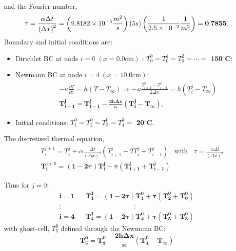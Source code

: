 \documentclass[calculator,steamtables,datasheet,solutions]{exam_newMarcus2}
\newcommand{\frc}{\displaystyle\frac}
\begin{document}
\begin{question}
\begin{enumerate}
{\begin{displaymath}
\end{displaymath}
and the Fourier number,~
\begin{displaymath}
  \tau = \frc{\alpha \Delta t}{\left(\Delta x\right)^{2}} = \left(9.8182\times 10^{-5} \frc{m^{2}}{s}\right)\left( 5 s\right)\left(\frc{1}{2.5\times 10^{-2}}\frc{1}{m^{2}}\right) = {\bf 0.7855}.
\end{displaymath}
Boundary and initial conditions are:
\begin{itemize}
    \item Dirichlet BC at node $i=0\;\left(x = 0.0\text{cm}\right)$ : {\bf $T_{0}^{0} = T_{0}^{1} = T_{0}^{2} = \cdots = $ 150$^{\circ}$C};~
    \item Newmann BC at node $i=4\;\left(x = 10.0\text{cm}\right)$: ~
          \begin{eqnarray}
             && - \kappa\frc{\partial T}{\partial x} = h\left( T - T_{\infty}\right) \Longrightarrow - \kappa\frc{T_{i+1}^{j}-T_{i-1}^{j}}{2\Delta x} = h\left( T_{i}^{j}- T_{\infty}\right) \nonumber \\
             && \mathbf{T_{i+1}^{j} = T_{i-1}^{j} - \frc{2 h \Delta x }{\kappa}\left(T_{i}^{j}-T_{\infty}\right)}, \nonumber
          \end{eqnarray}
    \item Initial conditions: {\bf $T_{1}^{0}=T_{2}^{0}=T_{3}^{0}=T_{4}^{0}=$ 20$^{\circ}$C}.~
\end{itemize}

The discretised thermal equation,~
\begin{eqnarray}
    && T_{i}^{j+1} = T_{i}^{j} + \alpha\frc{\Delta t}{\left(\Delta x\right)^{2}}\left(T_{i+1}^{j}-2T_{i}^{j}+T_{i-1}^{j}\right)\;\;\text{ with }\;\;\tau = \frc{\alpha \Delta t}{\left(\Delta x\right)^{2}} \nonumber \\
    && \mathbf{T_{i}^{j+1} = \left( 1- 2\tau \right)T_{i}^{j} + \tau\left(T_{i+1}^{j}+T_{i-1}^{j}\right)} \nonumber
\end{eqnarray}

Thus for $j=0$:~
         \begin{eqnarray}
             \mathbf{i=1}   &&  \mathbf{T_{1}^{1} = \left(1-2\tau\right)T_{1}^{0} + \tau\left(T_{2}^{0}+T_{0}^{0}\right)} \nonumber \\
               \vdots &&   \hspace{3cm}                \vdots \nonumber \\
             \mathbf{i=4}   &&  \mathbf{T_{4}^{1} = \left(1-2\tau\right)T_{4}^{0} + \tau\left(T_{5}^{0}+T_{3}^{0}\right)} \nonumber 
         \end{eqnarray} 
         with ghost-cell, $T_{5}^{0}$ defined through the Newmann BC:~
         \begin{displaymath}
             \mathbf{T_{5}^{0} = T_{3}^{0} - \frc{2 h\Delta x}{\kappa}\left(T_{4}^{0}-T_{\infty}\right)}
         \end{displaymath}

}
\end{enumerate}
\end{question}
\end{document}
